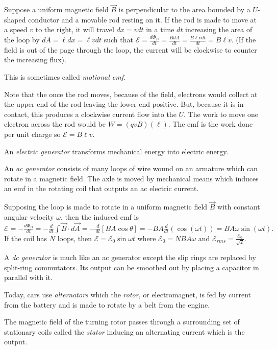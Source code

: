 \begin{remark}
    Suppose a uniform magnetic field $\vec{B}$ is perpendicular to the area bounded by a $U$-shaped conductor and a movable rod resting on it. If the rod is made to move at a speed $v$ to the right, it will travel $dx = v dt$ in a time $dt$ increasing the area of the loop by $dA = \ell dx = \ell vdt$ such that $\mathscr{E} = \frac{d\Phi_B}{dt}=\frac{BdA}{dt}=\frac{B\ell vdt}{dt}=B\ell v$. (If the field is out of the page through the loop, the current will be clockwise to counter the increasing flux).

    This is sometimes called \emph{motional emf}.

    Note that the once the rod moves, because of the field, electrons would collect at the upper end of the rod leaving the lower end positive. But, because it is in contact, this produces a clockwise current flow into the $U$. The work to move one electron across the rod would be $W = (qvB)(\ell)$. The emf is the work done per unit charge so $\mathscr{E} = B\ell v$.
\end{remark}
\begin{definition}
    An \emph{electric generator} transforms mechanical energy into electric energy.
\end{definition}
\begin{definition}[AC Generator]
    An \emph{ac generator} consists of many loops of wire wound on an armature which can rotate in a magnetic field. The axle is moved by mechanical means which induces an emf in the rotating coil that outputs an ac electric current. 

    Supposing the loop is made to rotate in a uniform magnetic field $\vec{B}$ with constant angular velocity $\omega$, then the induced emf is $\mathscr{E} = -\frac{d\Phi_B}{dt} = -\frac{d}{dt}\int\vec{B}\cdot d\vec{A} = -\frac{d}{dt}[BA\cos\theta] = -BA\frac{d}{dt}(\cos(\omega t)) = BA\omega\sin(\omega t).$ If the coil has $N$ loops, then $\mathscr{E} = \mathscr{E}_0\sin\omega t$ where $\mathscr{E}_0 = NBA\omega$ and $\mathscr{E}_{rms} = \frac{\mathscr{E}_0}{\sqrt{2}}$.
\end{definition}
\begin{definition}[DC Generator]
    A \emph{dc generator} is much like an ac generator except the slip rings are replaced by split-ring commutators. Its output can be smoothed out by placing a capacitor in parallel with it.
\end{definition}
\begin{definition}[Alternators]
    Today, cars use \emph{alternators} which the \emph{rotor}, or electromagnet, is fed by current from the battery and is made to rotate by a belt from the engine.

    The magnetic field of the turning rotor passes through a surrounding set of stationary coils called the \emph{stator} inducing an alternating current which is the output.
\end{definition}

